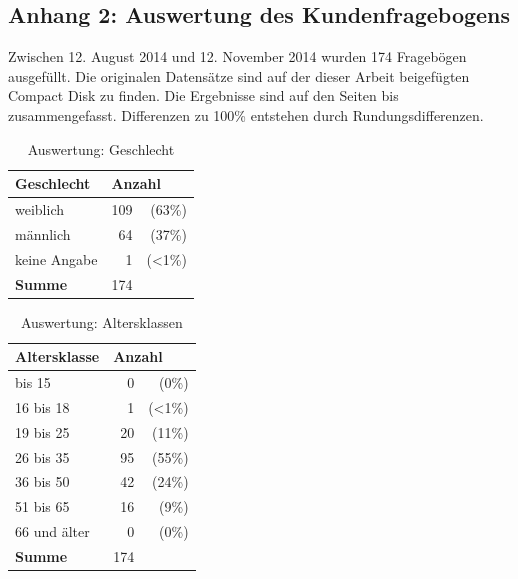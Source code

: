 \newpage
\subsection*{Anhang 2: Auswertung des Kundenfragebogens}

Zwischen 12. August 2014 und 12. November 2014 wurden 174 Fragebögen ausgefüllt. Die originalen Datensätze sind auf der dieser Arbeit beigefügten Compact Disk zu finden. Die Ergebnisse sind auf den Seiten \pageref{tab:geschlecht} bis \pageref{tab:usability} zusammengefasst. Differenzen zu 100\% entstehen durch Rundungsdifferenzen.

\begin{table}[H]
\begin{center}
\begin{footnotesize}
\begin{tabular}{| l | r  r |}  \hline                       
  \textbf{Geschlecht}              & \multicolumn{2}{|l|}{\textbf{Anzahl}}   \\ \hline 
  weiblich        &  109 &   (63\%)  \\  \hline  
  männlich        &  64  &   (37\%)  \\  \hline  
  keine Angabe    &  1   &   (<1\%)  \\  \hline  
  \textbf{Summe}  & 174  &   \\  \hline  
\end{tabular}
\end{footnotesize}
\caption{Auswertung: Geschlecht}
\label{tab:geschlecht}
\end{center}
\end{table}

\begin{table}[H]
\begin{center}
\begin{footnotesize}
\begin{tabular}{| l | r  r |}  \hline                       
  \textbf{Altersklasse}              & \multicolumn{2}{|l|}{\textbf{Anzahl}}   \\ \hline 
  bis 15          &  0 &   (0\%)  \\  \hline  
  16 bis 18       &  1 &   (<1\%)  \\  \hline  
  19 bis 25       & 20  &   (11\%)  \\  \hline  
  26 bis 35       & 95  &   (55\%)  \\  \hline  
  36 bis 50       & 42  &   (24\%)  \\  \hline  
  51 bis 65       & 16  &   (9\%)  \\  \hline  
  66 und älter    & 0  &   (0\%)  \\  \hline  
  \textbf{Summe}  & 174  &   \\  \hline  
\end{tabular}
\end{footnotesize}
\caption{Auswertung: Altersklassen}
\label{tab:altersklassen}
\end{center}
\end{table}

